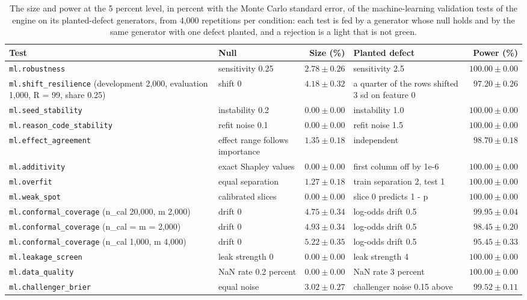 \begin{table}[htbp]
\centering
\setlength{\tabcolsep}{3pt}
\footnotesize
\caption{The size and power at the 5 percent level, in percent with the Monte Carlo standard error, of the machine-learning validation tests of the engine on its planted-defect generators, from 4,000 repetitions per condition: each test is fed by a generator whose null holds and by the same generator with one defect planted, and a rejection is a light that is not green.}
\label{tab:vt-ml-size}
\begin{tabular}{p{3.3cm}p{2.9cm}rp{3.1cm}r}
\toprule
Test & Null & Size (\%) & Planted defect & Power (\%) \\
\midrule
\nolinkurl{ml.robustness} & sensitivity 0.25 & $2.78\pm0.26$ & sensitivity 2.5 & $100.00\pm0.00$ \\
\nolinkurl{ml.shift_resilience} (development 2,000, evaluation 1,000, R = 99, share 0.25) & shift 0 & $4.18\pm0.32$ & a quarter of the rows shifted 3 sd on feature 0 & $97.20\pm0.26$ \\
\nolinkurl{ml.seed_stability} & instability 0.2 & $0.00\pm0.00$ & instability 1.0 & $100.00\pm0.00$ \\
\nolinkurl{ml.reason_code_stability} & refit noise 0.1 & $0.00\pm0.00$ & refit noise 1.5 & $100.00\pm0.00$ \\
\nolinkurl{ml.effect_agreement} & effect range follows importance & $1.35\pm0.18$ & independent & $98.70\pm0.18$ \\
\nolinkurl{ml.additivity} & exact Shapley values & $0.00\pm0.00$ & first column off by 1e-6 & $100.00\pm0.00$ \\
\nolinkurl{ml.overfit} & equal separation & $1.27\pm0.18$ & train separation 2, test 1 & $100.00\pm0.00$ \\
\nolinkurl{ml.weak_spot} & calibrated slices & $0.00\pm0.00$ & slice 0 predicts 1 - p & $100.00\pm0.00$ \\
\nolinkurl{ml.conformal_coverage} (n\_cal 20,000, m 2,000) & drift 0 & $4.75\pm0.34$ & log-odds drift 0.5 & $99.95\pm0.04$ \\
\nolinkurl{ml.conformal_coverage} (n\_cal = m = 2,000) & drift 0 & $4.93\pm0.34$ & log-odds drift 0.5 & $98.45\pm0.20$ \\
\nolinkurl{ml.conformal_coverage} (n\_cal 1,000, m 4,000) & drift 0 & $5.22\pm0.35$ & log-odds drift 0.5 & $95.45\pm0.33$ \\
\nolinkurl{ml.leakage_screen} & leak strength 0 & $0.00\pm0.00$ & leak strength 4 & $100.00\pm0.00$ \\
\nolinkurl{ml.data_quality} & NaN rate 0.2 percent & $0.00\pm0.00$ & NaN rate 3 percent & $100.00\pm0.00$ \\
\nolinkurl{ml.challenger_brier} & equal noise & $3.02\pm0.27$ & challenger noise 0.15 above & $99.52\pm0.11$ \\
\bottomrule
\end{tabular}
\end{table}
